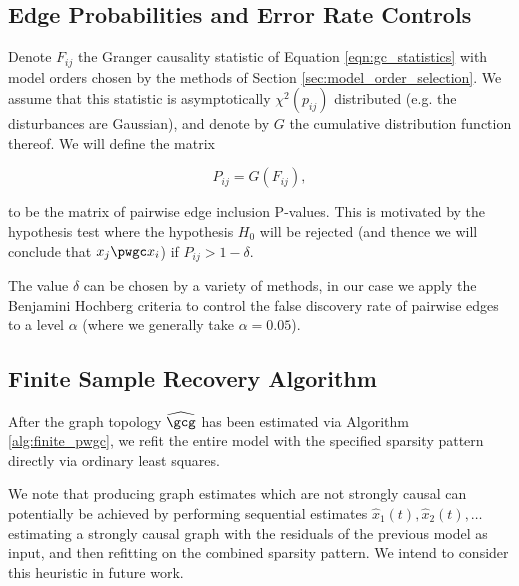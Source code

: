 \subsection{Edge Probabilities and Error Rate Controls}
\label{sec:error_rate_control}
Denote $F_{ij}$ the Granger causality statistic of Equation
\eqref{eqn:gc_statistics} with model orders chosen by the methods of
Section \ref{sec:model_order_selection}.  We assume that this
statistic is asymptotically $\chi^2(p_{ij})$ distributed (e.g. the
disturbances are Gaussian), and denote by $G$ the cumulative
distribution function thereof.  We will define the matrix

\begin{equation}
  \label{eqn:edge_inclusion_probability}
  P_{ij} = G(F_{ij}),
\end{equation}

to be the matrix of pairwise edge inclusion P-values.  This is
motivated by the hypothesis test where the hypothesis $H_0$ will be
rejected (and thence we will conclude that $x_j \pwgc x_i$) if
$P_{ij} > 1 - \delta$.

The value $\delta$ can be chosen by a variety of methods, in our case
we apply the Benjamini Hochberg criteria \cite{benjamini_hochberg}
\cite{all_of_statistics} to control the false discovery rate of
pairwise edges to a level $\alpha$ (where we generally take
$\alpha = 0.05$).

\subsection{Finite Sample Recovery Algorithm}
\label{sec:finite_pwgc}

After the graph topology $\widehat{\gcg}$ has been estimated via
Algorithm \ref{alg:finite_pwgc}, we refit the entire model with the
specified sparsity pattern directly via ordinary least squares.

We note that producing graph estimates which are not strongly causal
can potentially be achieved by performing sequential estimates
$\widehat{x}_1(t), \widehat{x}_2(t), \ldots$ estimating a strongly causal
graph with the residuals of the previous model as input, and then
refitting on the combined sparsity pattern.  We intend to consider
this heuristic in future work.

